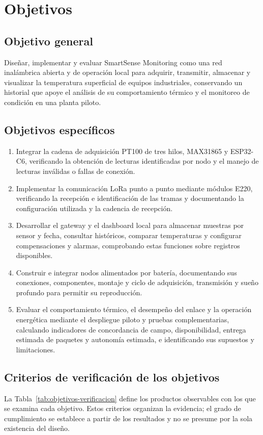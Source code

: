 \chapter{Objetivos}
\label{cap:objetivos}

\section{Objetivo general}
Diseñar, implementar y evaluar SmartSense Monitoring como una red inalámbrica abierta y de operación local para adquirir, transmitir, almacenar y visualizar la temperatura superficial de equipos industriales, conservando un historial que apoye el análisis de su comportamiento térmico y el monitoreo de condición en una planta piloto.

\section{Objetivos específicos}
\begin{enumerate}
  \item Integrar la cadena de adquisición PT100 de tres hilos, MAX31865 y ESP32-C6, verificando la obtención de lecturas identificadas por nodo y el manejo de lecturas inválidas o fallas de conexión.
  \item Implementar la comunicación LoRa punto a punto mediante módulos E220, verificando la recepción e identificación de las tramas y documentando la configuración utilizada y la cadencia de recepción.
  \item Desarrollar el gateway y el dashboard local para almacenar muestras por sensor y fecha, consultar históricos, comparar temperaturas y configurar compensaciones y alarmas, comprobando estas funciones sobre registros disponibles.
  \item Construir e integrar \NumeroNodos{} nodos alimentados por batería, documentando sus conexiones, componentes, montaje y ciclo de adquisición, transmisión y sueño profundo para permitir su reproducción.
  \item Evaluar el comportamiento térmico, el desempeño del enlace y la operación energética mediante el despliegue piloto y pruebas complementarias, calculando indicadores de concordancia de campo, disponibilidad, entrega estimada de paquetes y autonomía estimada, e identificando sus supuestos y limitaciones.
\end{enumerate}

\section{Criterios de verificación de los objetivos}
La Tabla~\ref{tab:objetivos-verificacion} define los productos observables con los que se examina cada objetivo. Estos criterios organizan la evidencia; el grado de cumplimiento se establece a partir de los resultados y no se presume por la sola existencia del diseño.

